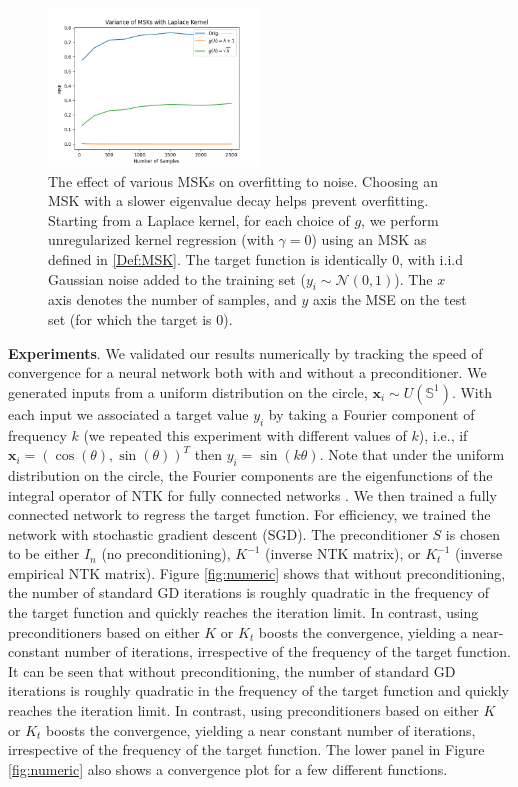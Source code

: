 \documentclass[10pt]{article} %
\theoremstyle{plain}
\theoremstyle{definition}
\theoremstyle{remark}
\newcommand{\x}{\mathbf{x}}
\begin{document}
\begin{figure}[tb]
    \centering
    \includegraphics[width=0.50\textwidth]{figures/benign_overfitting_new.png}
    \caption{The effect of various MSKs on overfitting to noise. Choosing an MSK with a slower eigenvalue decay helps prevent overfitting. Starting from a Laplace kernel, for each choice of $g$, we perform unregularized kernel regression (with $\gamma=0$) using an MSK as defined in \ref{Def:MSK}. The target function is identically $0$, with i.i.d Gaussian noise added to the training set ($y_i\sim \mathcal{N}(0,1)$). The $x$ axis denotes the number of samples, and $y$ axis the MSE on the test set (for which the target is $0$). }
    \label{fig:g_comparison}
\end{figure}



\textbf{Experiments}. 
We validated our results numerically by tracking the speed of convergence for a neural network both with and without a preconditioner. We generated inputs from a uniform distribution on the circle, $\x_i\sim U(\mathbb{S}^1)$. With each input we associated a target value $y_i$ by taking a Fourier component of frequency $k$ (we repeated this experiment with different values of $k$), i.e., if $\x_i=(\cos(\theta),\sin(\theta))^T$ then $y_i=\sin( k \theta)$. Note that under the uniform distribution on the circle, the Fourier components are the eigenfunctions of the integral operator of 
NTK for fully connected networks \citep{basri2019convergence}. We then trained a fully connected network to regress the target function. For efficiency, we trained the network with stochastic gradient descent (SGD). The preconditioner $S$ is chosen to be either $I_n$ (no preconditioning), $K^{-1}$ (inverse NTK matrix), or $K_t^{-1}$ (inverse empirical NTK matrix). Figure \ref{fig:numeric} shows that without preconditioning, the number of standard GD iterations is roughly quadratic in the frequency of the target function and quickly reaches the iteration limit. In contrast, using preconditioners based on either $K$ or $K_t$ boosts the convergence, yielding a near-constant number of iterations, irrespective of the frequency of the target function. 
It can be seen that without preconditioning, the number of standard GD iterations is roughly quadratic in the frequency of the target function and quickly reaches the iteration limit. In contrast, using preconditioners based on either $K$ or $K_t$ boosts the convergence, yielding a near constant number of iterations, irrespective of the frequency of the target function. The lower panel in Figure \ref{fig:numeric} also shows a convergence plot for a few different functions.
\end{document}
